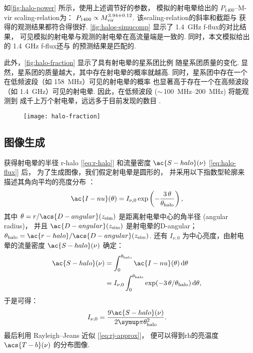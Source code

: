 如\autoref{fig:halo-power} 所示，使用上述调节好的参数，
模拟的射电晕给出的 $P_{1400}$--\ac{M-vir} \ac{scaling-relation}为：
$P_{1400} \propto M_{\mathrm{vir}}^{3.94 \pm 0.12}$.
该\ac{scaling-relation}的斜率和截距与 
获得的观测结果都符合得很好.
\autoref{fig:halos-simucomp} 显示了 \SI{1.4}{\GHz} \ac{f-flux}的对比结果，
可见模拟的射电晕与观测的射电晕在高流量端是一致的.
同时，本文模拟给出的 \SI{1.4}{\GHz} \ac{f-flux}还与
 的预测结果是匹配的.

此外，\autoref{fig:halo-fraction} 显示了具有射电晕的星系团比例
随星系团质量的变化.
显然，星系团的质量越大，其中存在射电晕的概率就越高.
同时，星系团中存在一个在低频波段（如 \SI{158}{\MHz}）可见的射电晕的概率
也显著高于存在一个在高频波段（如 \SI{1.4}{\GHz}）可见的射电晕.
因此，在低频波段 ($\sim$\,\SIrange{100}{200}{\MHz}) 将能观测到
成千上万个射电晕，远远多于目前发现的数目 \cite{cassano2012,cassano2015}.

\begin{figure}[htp]
  \centering
  \texttt{[image: halo-fraction]}
  \label{fig:halo-fraction}
\end{figure}

\subsection{图像生成}
\label{sec:halo-maps}

获得射电晕的半径 \ac{r-halo} [\autoref{eq:r-halo}]
和流量密度 $\ac{S-halo}(\nu)$ [\autoref{eq:halo-flux}] 后，
为了生成图像，我们假定射电晕是圆形的，
并采用以下指数型轮廓来描述其角向平均的亮度分布 \cite{murgia2009}：
\begin{equation}
  \label{eq:halo-profile}
  \ac{I-nu}(\theta) =
    I_{\nu,0} \exp\left( -\frac{3\,\theta}{\theta_{\R{halo}}} \right) ,
\end{equation}
其中
$\theta = r / \acs{D-angular}(z_{\R{sim}})$ 是距离射电晕中心的角半径
(angular radius)，
并且 $\ac{D-angular}(z_{\R{sim}})$ 是射电晕的\acl{D-angular}；
$\theta_{\R{halo}} = \ac{r-halo} / \acs{D-angular}(z_{\R{sim}})$.
还有 $I_{\nu,0}$ 为中心亮度，由射电晕的流量密度 $\ac{S-halo}(\nu)$ 确定：
\begin{align}
  \ac{S-halo}(\nu)
    & = \int_0^{\theta_{\R{halo}}} \ac{I-nu}(\theta) \,\D{\theta} \\
    & = I_{\nu,0} \int_0^{\theta_{\R{halo}}}
        \exp( -3\,\theta / \theta_{\R{halo}} ) \,\D{\theta} ,
\end{align}
于是可得：
\begin{equation}
  I_{\nu,0} = \frac{9 \ac{S-halo}(\nu)}{2\Cpi \theta^2_{\R{halo}}} .
\end{equation}
最后利用 Rayleigh--Jeans 近似 [\autoref{eq:rj-approx}]，
便可以得到\ac{rh}的亮温度 $\acs{T-b}(\nu)$ 的分布图像.

